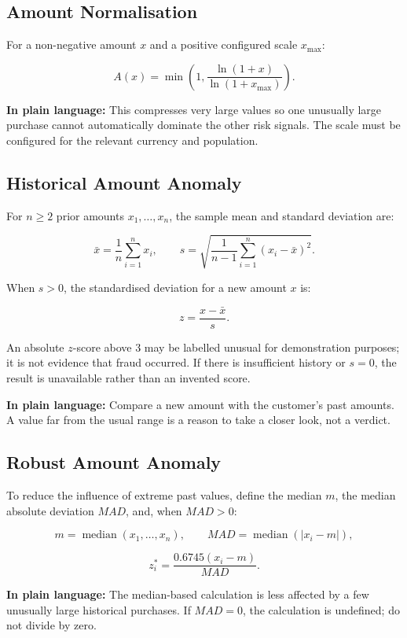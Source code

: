 \documentclass[11pt,a4paper]{article}
\begin{document}
\subsection{Amount Normalisation}

For a non-negative amount \(x\) and a positive configured scale
\(x_{\max}\):

\[
A(x)=
\min\left(1,\frac{\ln(1+x)}{\ln(1+x_{\max})}\right).
\]

\textbf{In plain language:} This compresses very large values so one
unusually large purchase cannot automatically dominate the other risk
signals. The scale must be configured for the relevant currency and
population.

\subsection{Historical Amount Anomaly}

For \(n\geq2\) prior amounts \(x_1,\ldots,x_n\), the sample mean and
standard deviation are:

\[
\bar{x}=\frac{1}{n}\sum_{i=1}^{n}x_i,
\qquad
s=\sqrt{\frac{1}{n-1}\sum_{i=1}^{n}(x_i-\bar{x})^2}.
\]

When \(s>0\), the standardised deviation for a new amount \(x\) is:

\[
z=\frac{x-\bar{x}}{s}.
\]

An absolute \(z\)-score above \(3\) may be labelled unusual for
demonstration purposes; it is not evidence that fraud occurred. If
there is insufficient history or \(s=0\), the result is unavailable
rather than an invented score.

\textbf{In plain language:} Compare a new amount with the customer's
past amounts. A value far from the usual range is a reason to take a
closer look, not a verdict.

\subsection{Robust Amount Anomaly}

To reduce the influence of extreme past values, define the median \(m\),
the median absolute deviation \(MAD\), and, when \(MAD>0\):

\[
m=\operatorname{median}(x_1,\ldots,x_n),
\qquad
MAD=\operatorname{median}(|x_i-m|),
\]

\[
z_i^*=\frac{0.6745(x_i-m)}{MAD}.
\]

\textbf{In plain language:} The median-based calculation is less
affected by a few unusually large historical purchases. If \(MAD=0\),
the calculation is undefined; do not divide by zero.
\end{document}
